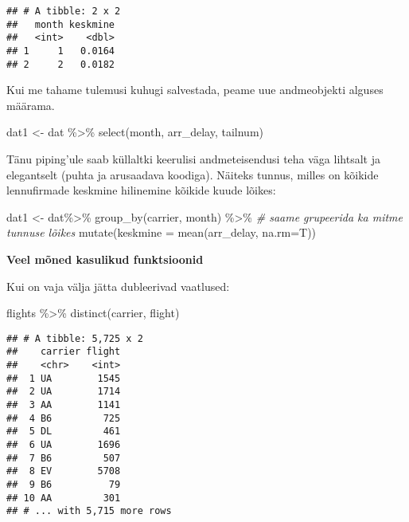 \documentclass[
]{book}
\newenvironment{Shaded}{\begin{snugshade}}{\end{snugshade}}
\newcommand{\AttributeTok}[1]{\textcolor[rgb]{0.77,0.63,0.00}{#1}}
\newcommand{\CommentTok}[1]{\textcolor[rgb]{0.56,0.35,0.01}{\textit{#1}}}
\newcommand{\FunctionTok}[1]{\textcolor[rgb]{0.00,0.00,0.00}{#1}}
\newcommand{\NormalTok}[1]{#1}
\newcommand{\OtherTok}[1]{\textcolor[rgb]{0.56,0.35,0.01}{#1}}
\newcommand{\SpecialCharTok}[1]{\textcolor[rgb]{0.00,0.00,0.00}{#1}}
\begin{document}
\begin{verbatim}
## # A tibble: 2 x 2
##   month keskmine
##   <int>    <dbl>
## 1     1   0.0164
## 2     2   0.0182
\end{verbatim}

Kui me tahame tulemusi kuhugi salvestada, peame uue andmeobjekti alguses määrama.

\begin{Shaded}
\begin{Highlighting}[]
\NormalTok{dat1 }\OtherTok{\textless{}{-}}\NormalTok{ dat }\SpecialCharTok{\%\textgreater{}\%}
  \FunctionTok{select}\NormalTok{(month, arr\_delay, tailnum)}
\end{Highlighting}
\end{Shaded}

Tänu piping'ule saab küllaltki keerulisi andmeteisendusi teha väga lihtsalt ja elegantselt (puhta ja arusaadava koodiga). Näiteks tunnus, milles on kõikide lennufirmade keskmine hilinemine kõikide kuude lõikes:

\begin{Shaded}
\begin{Highlighting}[]
\NormalTok{dat1 }\OtherTok{\textless{}{-}}\NormalTok{ dat}\SpecialCharTok{\%\textgreater{}\%}
  \FunctionTok{group\_by}\NormalTok{(carrier, month) }\SpecialCharTok{\%\textgreater{}\%} \CommentTok{\# saame grupeerida ka mitme tunnuse lõikes}
  \FunctionTok{mutate}\NormalTok{(}\AttributeTok{keskmine =} \FunctionTok{mean}\NormalTok{(arr\_delay, }\AttributeTok{na.rm=}\NormalTok{T))}
\end{Highlighting}
\end{Shaded}

\textbf{Veel mõned kasulikud funktsioonid}

Kui on vaja välja jätta dubleerivad vaatlused:

\begin{Shaded}
\begin{Highlighting}[]
\NormalTok{flights }\SpecialCharTok{\%\textgreater{}\%} 
  \FunctionTok{distinct}\NormalTok{(carrier, flight)}
\end{Highlighting}
\end{Shaded}

\begin{verbatim}
## # A tibble: 5,725 x 2
##    carrier flight
##    <chr>    <int>
##  1 UA        1545
##  2 UA        1714
##  3 AA        1141
##  4 B6         725
##  5 DL         461
##  6 UA        1696
##  7 B6         507
##  8 EV        5708
##  9 B6          79
## 10 AA         301
## # ... with 5,715 more rows
\end{verbatim}
\end{document}

